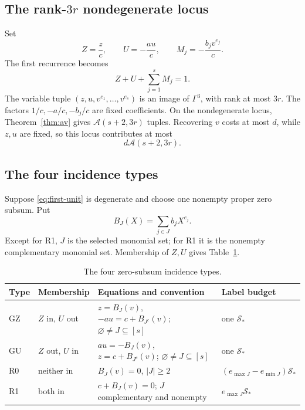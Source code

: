 \documentclass[11pt]{article}
\theoremstyle{definition}
\newcommand{\Acal}{\mathcal A}
\newcommand{\Scal}{\mathcal S}
\begin{document}
\subsection{The rank-\texorpdfstring{\(3r\)}{3r} nondegenerate locus}

Set
\begin{equation}
 Z=\frac zc,\qquad U=-\frac{au}{c},\qquad
 M_j=-\frac{b_jv^{e_j}}c.
 \label{eq:ZU}
\end{equation}
The first recurrence becomes
\begin{equation}
 Z+U+\sum_{j=1}^{s}M_j=1.
 \label{eq:first-unit}
\end{equation}
The variable tuple \((z,u,v^{e_1},\ldots,v^{e_s})\) is an image of \(\Gamma^3\), with rank at most \(3r\). The factors \(1/c,-a/c,-b_j/c\) are fixed coefficients. On the nondegenerate locus, Theorem~\ref{thm:av} gives \(\Acal(s+2,3r)\) tuples. Recovering \(v\) costs at most \(d\), while \(z,u\) are fixed, so this locus contributes at most
\begin{equation}
 d\Acal(s+2,3r).
 \label{eq:pc1-nondeg}
\end{equation}

\subsection{The four incidence types}

Suppose \eqref{eq:first-unit} is degenerate and choose one nonempty proper zero subsum. Put
\begin{equation}
 B_J(X)=\sum_{j\in J}b_jX^{e_j}.
 \label{eq:BJ}
\end{equation}
Except for R1, \(J\) is the selected monomial set; for R1 it is the nonempty complementary monomial set. Membership of \(Z,U\) gives Table~\ref{tab:four-types}.

\begin{table}[t]
\centering
\small
\caption{The four zero-subsum incidence types.}
\label{tab:four-types}
\begin{tabularx}{\textwidth}{@{}l l X X@{}}
\toprule
Type & Membership & Equations and convention & Label budget\\
\midrule
GZ & \(Z\) in, \(U\) out &
\(z=B_J(v)\), \(-au=c+B_{J^c}(v)\);
\(\varnothing\neq J\subseteq[s]\) & one \(\Scal_*\)\\
GU & \(Z\) out, \(U\) in &
\(au=-B_J(v)\), \(z=c+B_{J^c}(v)\);
\(\varnothing\neq J\subseteq[s]\) & one \(\Scal_*\)\\
R0 & neither in &
\(B_J(v)=0\), \(|J|\geq2\) &
\((e_{\max J}-e_{\min J})\Scal_*\)\\
R1 & both in &
\(c+B_J(v)=0\);
\(J\) complementary and nonempty &
\(e_{\max J}\Scal_*\)\\
\bottomrule
\end{tabularx}
\end{table}
\end{document}
